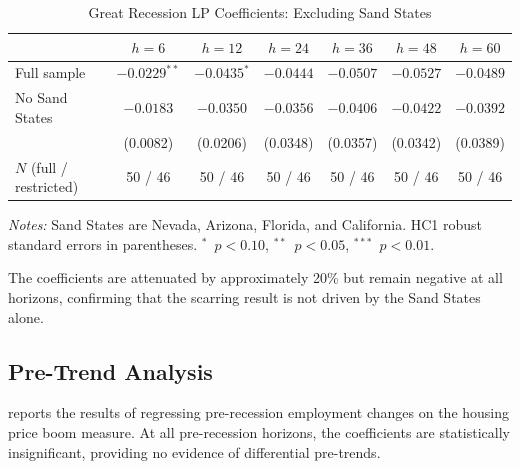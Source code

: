 \documentclass[12pt]{article}
\begin{document}
\begin{table}[H]
\centering
\caption{Great Recession LP Coefficients: Excluding Sand States}
\label{tab:app_sand}
\begin{threeparttable}
\small
\begin{tabular}{lcccccc}
\toprule
& $h=6$ & $h=12$ & $h=24$ & $h=36$ & $h=48$ & $h=60$ \\
\midrule
Full sample & $-0.0229^{**}$ & $-0.0435^{*}$ & $-0.0444$ & $-0.0507$ & $-0.0527$ & $-0.0489$ \\
No Sand States & $-0.0183$ & $-0.0350$ & $-0.0356$ & $-0.0406$ & $-0.0422$ & $-0.0392$ \\
             & (0.0082) & (0.0206) & (0.0348) & (0.0357) & (0.0342) & (0.0389) \\
\midrule
$N$ (full / restricted) & 50 / 46 & 50 / 46 & 50 / 46 & 50 / 46 & 50 / 46 & 50 / 46 \\
\bottomrule
\end{tabular}
\begin{tablenotes}[flushleft]
\small
\item \textit{Notes:} Sand States are Nevada, Arizona, Florida, and California. HC1 robust standard errors in parentheses. $^{*}$~$p<0.10$, $^{**}$~$p<0.05$, $^{***}$~$p<0.01$.
\end{tablenotes}
\end{threeparttable}
\end{table}

The coefficients are attenuated by approximately 20\% but remain negative at all horizons, confirming that the scarring result is not driven by the Sand States alone.

\subsection{Pre-Trend Analysis}

 reports the results of regressing pre-recession employment changes on the housing price boom measure. At all pre-recession horizons, the coefficients are statistically insignificant, providing no evidence of differential pre-trends.
\end{document}
